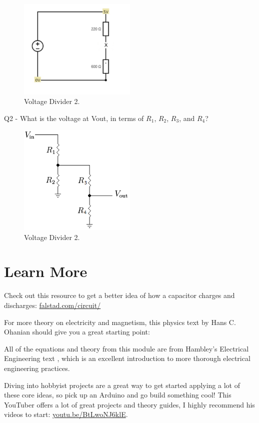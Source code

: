 \documentclass[a4paper]{article}
\begin{document}
\begin{figure}[h!]
\centering
\includegraphics[width=0.5\textwidth]{q2.jpg}
\caption{\label{fig:data}Voltage Divider 2.}
\end{figure}

\newpage
\noindent
Q2 - What is the voltage at Vout, in terms of  $R_{1}$, $R_{2}$, $R_{3}$, and $R_{4}$?

\begin{figure}[h!]
\centering
\includegraphics[width=0.5\textwidth]{q3.png}
\caption{\label{fig:data}Voltage Divider 2.}
\end{figure}


\newpage
\section{Learn More}
\noindent
Check out this resource to get a better idea of how a capacitor charges and discharges:
\href{https://www.falstad.com/circuit/}{falstad.com/circuit/}

\vspace{0.5cm}
\noindent
For more theory on electricity and magnetism, this physics text by Hans C. Ohanian should give you a great starting point: \cite{9780393930047}

\vspace{0.5cm}
\noindent
All of the equations and theory from this module are from Hambley's Electrical Engineering text \cite{9780133116649}, which is an excellent introduction to more thorough electrical engineering practices.

\vspace{0.5cm}
\noindent
Diving into hobbyist projects are a great way to get started applying a lot of these core ideas, so pick up an Arduino and go build something cool! This YouTuber offers a lot of great projects and theory guides, I highly recommend his videos to start: \href{https://youtu.be/BtLwoNJ6klE}{youtu.be/BtLwoNJ6klE}.



\end{document}
